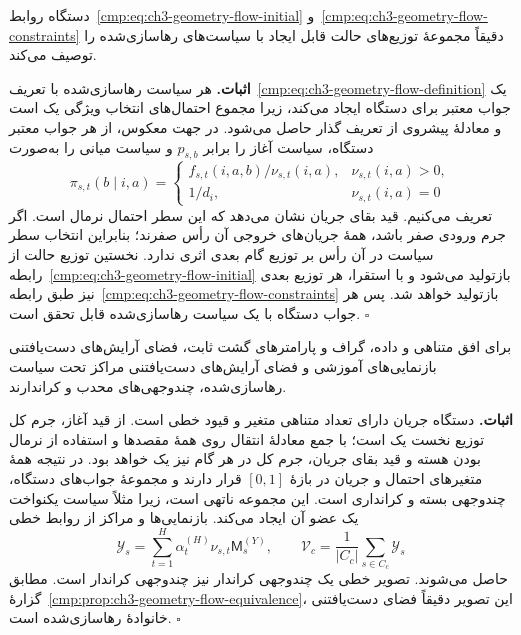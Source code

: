 \begin{proposition}\label{cmp:prop:ch3-geometry-flow-equivalence}
دستگاه روابط~\eqref{cmp:eq:ch3-geometry-flow-initial} و~\eqref{cmp:eq:ch3-geometry-flow-constraints} دقیقاً مجموعهٔ توزیع‌های حالت قابل ایجاد با سیاست‌های رهاسازی‌شده را توصیف می‌کند.
\end{proposition}
\noindent\textbf{اثبات.}
هر سیاست رهاسازی‌شده با تعریف~\eqref{cmp:eq:ch3-geometry-flow-definition} یک جواب معتبر برای دستگاه ایجاد می‌کند، زیرا مجموع احتمال‌های انتخاب ویژگی یک است و معادلهٔ پیشروی از تعریف گذار حاصل می‌شود. در جهت معکوس، از هر جواب معتبر دستگاه، سیاست آغاز را برابر $p_{s,b}$ و سیاست میانی را به‌صورت
\begin{equation}\label{cmp:eq:ch3-geometry-flow-policy-reconstruction}
\pi_{s,t}(b\mid i,a)=
\begin{cases}
f_{s,t}(i,a,b)/\nu_{s,t}(i,a),&\nu_{s,t}(i,a)>0,\\
1/d_i,&\nu_{s,t}(i,a)=0
\end{cases}
\end{equation}
تعریف می‌کنیم. قید بقای جریان نشان می‌دهد که این سطر احتمال نرمال است. اگر جرم ورودی صفر باشد، همهٔ جریان‌های خروجی آن رأس صفرند؛ بنابراین انتخاب سطر سیاست در آن رأس بر توزیع گام بعدی اثری ندارد. نخستین توزیع حالت از رابطه~\eqref{cmp:eq:ch3-geometry-flow-initial} بازتولید می‌شود و با استقرا، هر توزیع بعدی نیز طبق رابطه~\eqref{cmp:eq:ch3-geometry-flow-constraints} بازتولید خواهد شد. پس هر جواب دستگاه با یک سیاست رهاسازی‌شده قابل تحقق است. $\square$

\begin{theorem}\label{cmp:thm:ch3-geometry-flow-polytope}
برای افق متناهی و داده، گراف و پارامترهای گشت ثابت، فضای آرایش‌های دست‌یافتنی بازنمایی‌های آموزشی و فضای آرایش‌های دست‌یافتنی مراکز تحت سیاست رهاسازی‌شده، چندوجهی‌های محدب و کراندارند.
\end{theorem}
\noindent\textbf{اثبات.}
دستگاه جریان دارای تعداد متناهی متغیر و قیود خطی است. از قید آغاز، جرم کل توزیع نخست یک است؛ با جمع معادلهٔ انتقال روی همهٔ مقصدها و استفاده از نرمال بودن هسته و قید بقای جریان، جرم کل در هر گام نیز یک خواهد بود. در نتیجه همهٔ متغیرهای احتمال و جریان در بازهٔ $[0,1]$ قرار دارند و مجموعهٔ جواب‌های دستگاه، چندوجهی بسته و کرانداری است. این مجموعه ناتهی است، زیرا مثلاً سیاست یکنواخت یک عضو آن ایجاد می‌کند. بازنمایی‌ها و مراکز از روابط خطی
\begin{equation}\label{cmp:eq:ch3-geometry-flow-output}
\mathscr Y_s=\sum_{t=1}^H\alpha_t^{(H)}\nu_{s,t}\mathsf M_s^{(Y)},\qquad
\mathcal V_c=\frac1{|C_c|}\sum_{s\in C_c}\mathscr Y_s
\end{equation}
حاصل می‌شوند. تصویر خطی یک چندوجهی کراندار نیز چندوجهی کراندار است. مطابق گزارهٔ~\ref{cmp:prop:ch3-geometry-flow-equivalence}، این تصویر دقیقاً فضای دست‌یافتنی خانوادهٔ رهاسازی‌شده است. $\square$

